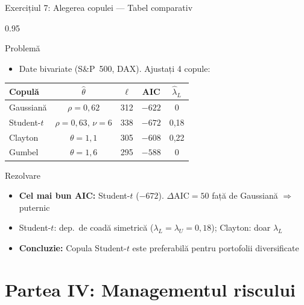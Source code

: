 \documentclass[9pt, aspectratio=169, t]{beamer}
\begin{document}
\begin{frame}{Exercițiul 7: Alegerea copulei --- Tabel comparativ}
    \begin{cminipage}{0.95\textwidth}
\begin{block}{Problemă}
\begin{itemize}\setlength{\itemsep}{0pt}
    \item Date bivariate (S\&P~500, DAX). Ajustați 4 copule:
\end{itemize}
\renewcommand{\arraystretch}{1.1}
\begin{center}
\begin{tabular}{lcccc}
\toprule
\textbf{Copulă} & $\hat{\theta}$ & $\ell$ & \textbf{AIC} & $\hat{\lambda}_L$ \\
\midrule
Gaussiană & $\rho = 0{,}62$ & 312 & $-622$ & 0 \\
Student-$t$ & $\rho = 0{,}63$, $\nu = 6$ & 338 & $-672$ & 0{,}18 \\
Clayton & $\theta = 1{,}1$ & 305 & $-608$ & 0{,}22 \\
Gumbel & $\theta = 1{,}6$ & 295 & $-588$ & 0 \\
\bottomrule
\end{tabular}
\end{center}
\end{block}

\begin{exampleblock}{Rezolvare}
\small
\begin{itemize}\setlength{\itemsep}{0pt}
    \item \textbf{Cel mai bun AIC:} Student-$t$ ($-672$). $\Delta\text{AIC} = 50$ față de Gaussiană $\Rightarrow$ puternic
    \item Student-$t$: dep.\ de coadă simetrică ($\lambda_L = \lambda_U = 0{,}18$); Clayton: doar $\lambda_L$
    \item \textbf{Concluzie:} Copula Student-$t$ este preferabilă pentru portofolii diversificate
\end{itemize}
\end{exampleblock}
    \end{cminipage}
\end{frame}

\section{Partea IV: Managementul riscului}
\end{document}
